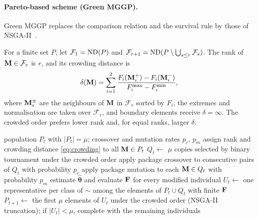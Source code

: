 \paragraph{Pareto-based scheme (Green MGGP).}
Green MGGP replaces the comparison relation and the survival rule by those of NSGA-II~\cite{DPAM2002}.

\begin{definition}\label{def:crowding}
For a finite set $P$, let $\mathcal F_1=\operatorname{ND}(P)$ and $\mathcal F_{r+1}=\operatorname{ND}(P\setminus\bigcup_{s\le r}\mathcal F_s)$.
The rank of $\mathbf{M}\in\mathcal F_r$ is $r$, and its crowding distance is
\begin{equation}
\delta(\mathbf{M})=\sum_{i=1}^{2}\frac{F_i(\mathbf{M}^{+}_i)-F_i(\mathbf{M}^{-}_i)}{F_i^{\max}-F_i^{\min}},
\label{eq:crowding}
\end{equation}
where $\mathbf{M}^{\pm}_i$ are the neighbours of $\mathbf{M}$ in $\mathcal F_r$ sorted by $F_i$, the extremes and normalisation are
taken over $\mathcal F_r$, and boundary elements receive $\delta=\infty$. The crowded order prefers lower rank and,
for equal ranks, larger $\delta$.
\end{definition}

\begin{algorithm}[t]
\caption{One generation of Green MGGP}\label{alg:green}
\begin{algorithmic}[1]
\Require population $P_t$ with $|P_t|=\mu$; crossover and mutation rates $p_c$, $p_m$
\State assign rank and crowding distance \eqref{eq:crowding} to all $\mathbf{M}\in P_t$
\State $Q_t\gets$ $\mu$ copies selected by binary tournament under the crowded order
\State apply package crossover to consecutive pairs of $Q_t$ with probability $p_c$
\State apply package mutation to each $\mathbf{M}\in Q_t$ with probability $p_m$
\State estimate $\hat{\boldsymbol\theta}$ and evaluate $\mathbf{F}$ for every modified individual
\State $U_t\gets$ one representative per class of $\sim$ among the elements of $P_t\cup Q_t$ with finite $\mathbf{F}$
\State $P_{t+1}\gets$ the first $\mu$ elements of $U_t$ under the crowded order (NSGA-II truncation); if $|U_t|<\mu$,
complete with the remaining individuals
\end{algorithmic}
\end{algorithm}

